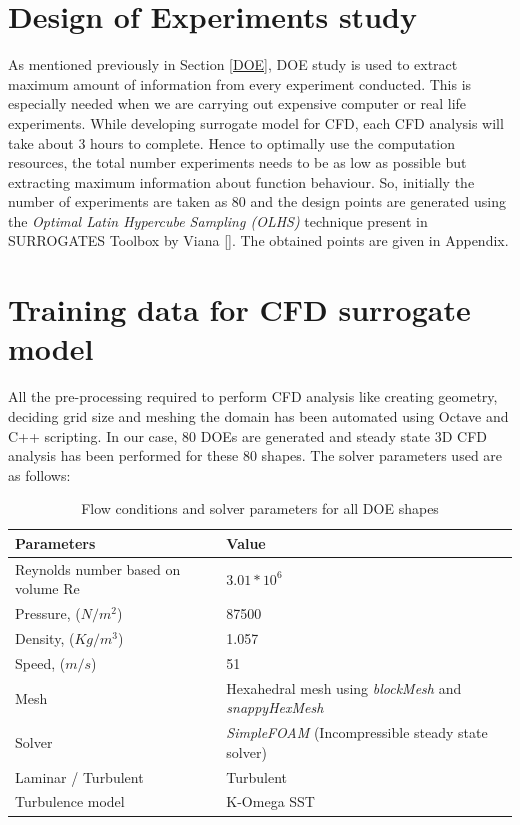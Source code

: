 \section{Design of Experiments study}

As mentioned previously in Section \ref{DOE}, DOE study is used to extract maximum amount of information from every experiment conducted. This is especially needed when we are carrying out expensive computer or real life experiments. While developing surrogate model for CFD, each CFD analysis will take about 3 hours to complete. Hence to optimally use the computation resources, the total number experiments needs to be as low as possible but extracting maximum information about function behaviour. So, initially the number of experiments are taken as 80 and the design points are generated using the \textit{Optimal Latin Hypercube Sampling (OLHS)} technique present in SURROGATES Toolbox by Viana []. The obtained points are given in Appendix.


\section{Training data for CFD surrogate model}
\label{Training data CFD}
All the pre-processing required to perform CFD analysis like creating geometry, deciding grid size and meshing the domain has been automated using Octave and C++ scripting. In our case, 80 DOEs are generated and steady state 3D CFD analysis has been performed for these 80 shapes. The solver parameters used are as follows:
\begin{table}[H]
	\caption{Flow conditions and solver parameters for all DOE shapes}
	\label{Flow conditions and solver parametres for all DOE shapes}
	\centering
	\begin{tabular}{ll}
		\hline \hline
		Parameters & Value \\ 
		\hline \hline
		Reynolds number based on volume Re & $ 3.01 \ast 10^6 $ \\
		Pressure, ($ N/m^2 $) & 87500 \\
		Density, ($ Kg/m^3 $) & 1.057 \\
		Speed, ($ m/s $) & 51 \\
		Mesh & Hexahedral mesh using \textit{blockMesh} and \textit{snappyHexMesh} \\
		Solver & \textit{SimpleFOAM} (Incompressible steady state solver) \\
		Laminar / Turbulent & Turbulent \\
		Turbulence model & K-Omega SST \\
		\hline \hline
	\end{tabular}
\end{table}
